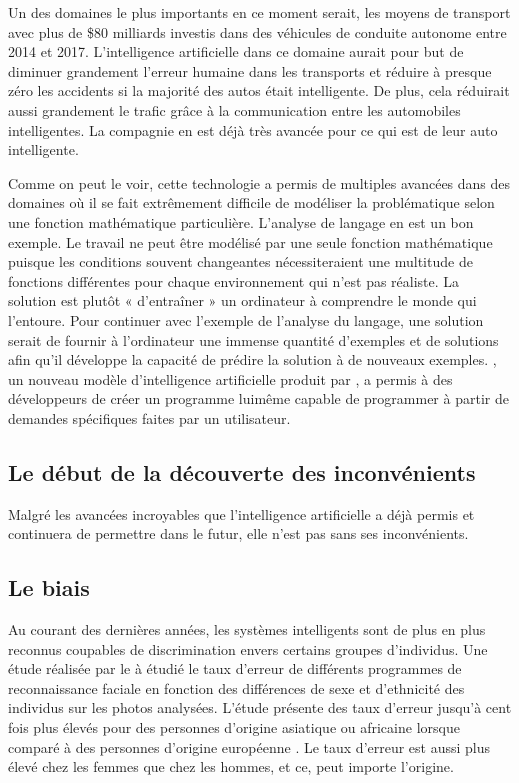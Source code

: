 \documentclass[letterpaper,10pt,french]{sphinxmanual}
\begin{document}
Un des domaines le plus importants en ce moment serait, les moyens de transport avec plus de \$80
milliards investis dans des véhicules de conduite autonome entre 2014 et 2017. L’intelligence
artificielle dans ce domaine aurait pour but de diminuer grandement l’erreur humaine dans les transports
et réduire à presque zéro les accidents si la majorité des autos était intelligente. De plus, cela réduirait
aussi grandement le trafic grâce à la communication entre les automobiles intelligentes. La compagnie 
en est déjà très avancée pour ce qui est de leur auto intelligente.

Comme on peut le voir, cette technologie a permis de multiples avancées dans des domaines où
il se fait extrêmement difficile de modéliser la problématique selon une
fonction mathématique particulière. L’analyse de langage en est un bon exemple.
Le travail ne peut être modélisé par une seule fonction mathématique puisque
les conditions souvent changeantes nécessiteraient une multitude de fonctions
différentes pour chaque environnement qui n’est pas réaliste. La solution est
plutôt « d’entraîner » un ordinateur à comprendre le monde qui l’entoure.
Pour continuer avec l’exemple de l’analyse du langage, une solution serait
de fournir à l’ordinateur une immense quantité d’exemples et de solutions afin
qu’il développe la capacité de prédire la solution à de nouveaux exemples.
,
un nouveau modèle d’intelligence artificielle produit par
, a permis à des développeurs de créer un programme
lui\sphinxhyphen{}même capable de programmer à partir de demandes spécifiques faites par un
utilisateur.


\subsection{Le début de la découverte des inconvénients}
\label{\detokenize{enonce_sujet:le-debut-de-la-decouverte-des-inconvenients}}
Malgré les avancées incroyables que l’intelligence artificielle a déjà permis et
continuera de permettre dans le futur, elle n’est pas sans ses inconvénients.


\subsection{Le biais}
\label{\detokenize{enonce_sujet:le-biais}}
Au
courant des dernières années, les systèmes intelligents sont de plus en plus
reconnus coupables de discrimination envers certains groupes d’individus. Une
étude réalisée par le  à étudié le taux d’erreur de
différents programmes de reconnaissance faciale en fonction des différences de
sexe et d’ethnicité des individus sur les photos analysées. L’étude
présente des taux d’erreur
jusqu’à cent fois plus élevés pour des personnes d’origine asiatique ou
africaine lorsque comparé à des personnes d’origine européenne .
Le taux d’erreur est aussi plus élevé chez les femmes que chez les hommes, et
ce, peut importe l’origine.
\end{document}

